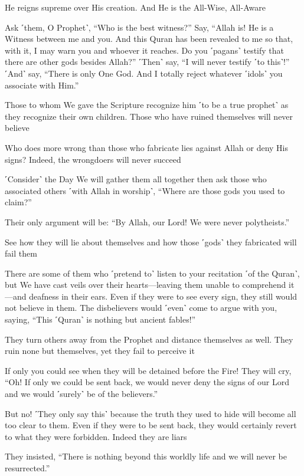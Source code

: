 He reigns supreme over His creation. And He is the All-Wise, All-Aware

Ask ˹them, O Prophet˺, “Who is the best witness?” Say, “Allah is! He is a Witness between me and you. And this Quran has been revealed to me so that, with it, I may warn you and whoever it reaches. Do you ˹pagans˺ testify that there are other gods besides Allah?” ˹Then˺ say, “I will never testify ˹to this˺!” ˹And˺ say, “There is only One God. And I totally reject whatever ˹idols˺ you associate with Him.”

Those to whom We gave the Scripture recognize him ˹to be a true prophet˺ as they recognize their own children. Those who have ruined themselves will never believe

Who does more wrong than those who fabricate lies against Allah or deny His signs? Indeed, the wrongdoers will never succeed

˹Consider˺ the Day We will gather them all together then ask those who associated others ˹with Allah in worship˺, “Where are those gods you used to claim?”

Their only argument will be: “By Allah, our Lord! We were never polytheists.”

See how they will lie about themselves and how those ˹gods˺ they fabricated will fail them

There are some of them who ˹pretend to˺ listen to your recitation ˹of the Quran˺, but We have cast veils over their hearts—leaving them unable to comprehend it—and deafness in their ears. Even if they were to see every sign, they still would not believe in them. The disbelievers would ˹even˺ come to argue with you, saying, “This ˹Quran˺ is nothing but ancient fables!”

They turn others away from the Prophet and distance themselves as well. They ruin none but themselves, yet they fail to perceive it

If only you could see when they will be detained before the Fire! They will cry, “Oh! If only we could be sent back, we would never deny the signs of our Lord and we would ˹surely˺ be of the believers.”

But no! ˹They only say this˺ because the truth they used to hide will become all too clear to them. Even if they were to be sent back, they would certainly revert to what they were forbidden. Indeed they are liars

They insisted, “There is nothing beyond this worldly life and we will never be resurrected.”

